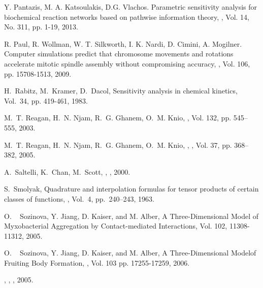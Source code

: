 \begin{thebibliography}{99}
Y. Pantazis, M. A. Katsoulakis, D.G. Vlachos.
\newblock Parametric sensitivity analysis for biochemical reaction
networks based on pathwise information theory, , Vol. 14, No. 311, pp.
1-19, 2013.

R. Paul, R. Wollman, W. T. Silkworth, I. K. Nardi, D. Cimini, A.
Mogilner. \newblock Computer simulations predict that chromosome
movements and rotations accelerate mitotic spindle assembly without
compromising accuracy, , Vol. 106, pp.
15708-1513, 2009.

\newblock H.~Rabitz, M.~Kramer, D.~Dacol, Sensitivity analysis in chemical kinetics,
 Vol.~34, pp. 419-461, 1983.


\newblock M.~T. Reagan, H.~N. Njam, R.~G. Ghanem, O.~M. Knio, ,
 Vol. 132, pp. 545--555, 2003.

\newblock M.~T. Reagan, H.~N. Njam, R.~G. Ghanem, O.~M. Knio, , , Vol. 37, pp. 368--382, 2005.



\newblock A.~Saltelli, K.~Chan, M.~Scott, , , 2000.

\newblock S.~Smolyak, \newblock Quadrature and interpolation formulas for tensor products of
\newblock  certain classes of functions, , Vol.~4,  pp.~240--243, 1963.

\newblock O. ~ Sozinova, Y. Jiang, D. Kaiser, and M. Alber, \newblock A Three-Dimensional Model of Myxobacterial Aggregation by
Contact-mediated Interactions, 
Vol. 102, 11308-11312, 2005.

\newblock O. ~ Sozinova, Y. Jiang, D. Kaiser, and M. Alber, \newblock A
Three-Dimensional Modelof Fruiting Body Formation,
, Vol. 103 pp. 17255-17259, 2006.

, ,
, 2005.


\end{thebibliography}
